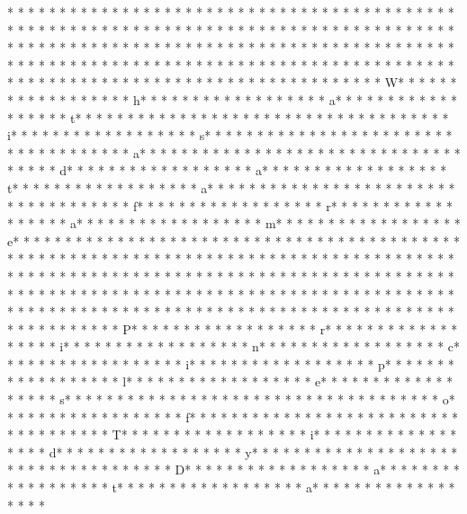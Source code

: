 * * *  * * *  * * *  *  * * *  *  * * *  * 	* * *  * * *  * * *  *  * * *  *  * * *  * 	* * *  * * *  * * *  *  * * *  *  * * *  * * *  * * *  *  * * *  *  * * *  * * *  * * *  *  * * *  *  * * *  *  * * *  * * *  * * *  *  * * *  *  * * *  *  * * *  * * *  * * *  *  * * *  *  * * *  *  * * *  * * *  * * *  *  * * *  *  * * *  *  * * *  * * *  * * *  *  * * *  *  * * *  *  * * *  * * *  * * *  *  * * *  *  * * *  *  * * *  * * *  * * *  *  * * *  *  * * *  *  * * *  * * *  * * *  *  * * *  *  * * *  * W* * *  * * *  * * *  *  * * *  *  * * *  * h* * *  * * *  * * *  *  * * *  *  * * *  * a* * *  * * *  * * *  *  * * *  *  * * *  * t* * *  * * *  * * *  *  * * *  *  * * *  *  * * *  * * *  * * *  *  * * *  *  * * *  * i* * *  * * *  * * *  *  * * *  *  * * *  * s* * *  * * *  * * *  *  * * *  *  * * *  *  * * *  * * *  * * *  *  * * *  *  * * *  * a* * *  * * *  * * *  *  * * *  *  * * *  *  * * *  * * *  * * *  *  * * *  *  * * *  * d* * *  * * *  * * *  *  * * *  *  * * *  * a* * *  * * *  * * *  *  * * *  *  * * *  * t* * *  * * *  * * *  *  * * *  *  * * *  * a* * *  * * *  * * *  *  * * *  *  * * *  *  * * *  * * *  * * *  *  * * *  *  * * *  * f* * *  * * *  * * *  *  * * *  *  * * *  * r* * *  * * *  * * *  *  * * *  *  * * *  * a* * *  * * *  * * *  *  * * *  *  * * *  * m* * *  * * *  * * *  *  * * *  *  * * *  * e* * *  * * *  * * *  *  * * *  *  * * *  * 
* * *  * * *  * * *  *  * * *  *  * * *  * 	* * *  * * *  * * *  *  * * *  *  * * *  * 	* * *  * * *  * * *  *  * * *  *  * * *  * * *  * * *  *  * * *  *  * * *  * * *  * * *  *  * * *  *  * * *  *  * * *  * * *  * * *  *  * * *  *  * * *  *  * * *  * * *  * * *  *  * * *  *  * * *  *  * * *  * * *  * * *  *  * * *  *  * * *  *  * * *  * * *  * * *  *  * * *  *  * * *  *  * * *  * * *  * * *  *  * * *  *  * * *  *  * * *  * * *  * * *  *  * * *  *  * * *  *  * * *  * * *  * * *  *  * * *  *  * * *  * P* * *  * * *  * * *  *  * * *  *  * * *  * r* * *  * * *  * * *  *  * * *  *  * * *  * i* * *  * * *  * * *  *  * * *  *  * * *  * n* * *  * * *  * * *  *  * * *  *  * * *  * c* * *  * * *  * * *  *  * * *  *  * * *  * i* * *  * * *  * * *  *  * * *  *  * * *  * p* * *  * * *  * * *  *  * * *  *  * * *  * l* * *  * * *  * * *  *  * * *  *  * * *  * e* * *  * * *  * * *  *  * * *  *  * * *  * s* * *  * * *  * * *  *  * * *  *  * * *  *  * * *  * * *  * * *  *  * * *  *  * * *  * o* * *  * * *  * * *  *  * * *  *  * * *  * f* * *  * * *  * * *  *  * * *  *  * * *  *  * * *  * * *  * * *  *  * * *  *  * * *  * T* * *  * * *  * * *  *  * * *  *  * * *  * i* * *  * * *  * * *  *  * * *  *  * * *  * d* * *  * * *  * * *  *  * * *  *  * * *  * y* * *  * * *  * * *  *  * * *  *  * * *  *  * * *  * * *  * * *  *  * * *  *  * * *  * D* * *  * * *  * * *  *  * * *  *  * * *  * a* * *  * * *  * * *  *  * * *  *  * * *  * t* * *  * * *  * * *  *  * * *  *  * * *  * a* * *  * * *  * * *  *  * * *  *  * * *  * 
